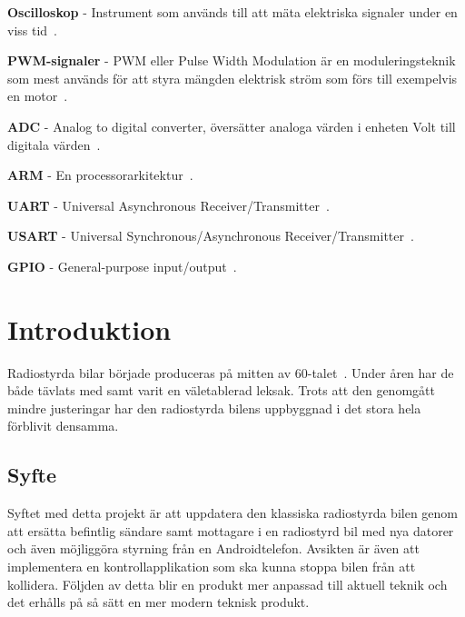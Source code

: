 \documentclass[a4paper]{article}
\begin{document}
\vspace{5mm} \noindent
{\bf Oscilloskop} - Instrument som används till att mäta elektriska signaler under en viss tid~\cite{oscilloscope}.


\vspace{5mm} \noindent
{\bf PWM-signaler} - PWM eller Pulse Width Modulation är en moduleringsteknik som mest används för att styra mängden elektrisk ström som förs till exempelvis en motor~\cite{PWM}.



\vspace{5mm} \noindent
{\bf ADC} - Analog to digital converter, översätter analoga värden i enheten Volt till digitala värden~\cite{ADC}.

\vspace{5mm} \noindent
{\bf ARM} - En processorarkitektur~\cite{chalmersARM}.

\vspace{5mm} \noindent
{\bf UART} - Universal Asynchronous Receiver/Transmitter~\cite{chalmersARM}.

\vspace{5mm} \noindent
{\bf USART} - Universal Synchronous/Asynchronous Receiver/Transmitter~\cite{chalmersARM}.

\vspace{5mm} \noindent
{\bf GPIO} - General-purpose input/output~\cite{chalmersARM}.



\newpage
\section{Introduktion}

Radiostyrda bilar började produceras på mitten av 60-talet~\cite{RCHistory}. Under åren har de både tävlats med samt varit en väletablerad leksak. Trots att den genomgått mindre justeringar har den radiostyrda bilens uppbyggnad i det stora hela förblivit densamma.

\subsection{Syfte}

Syftet med detta projekt är att uppdatera den klassiska radiostyrda bilen genom att ersätta befintlig sändare samt mottagare i en radiostyrd bil med nya datorer och även möjliggöra styrning från en Androidtelefon. Avsikten är även att implementera en kontrollapplikation som ska kunna stoppa bilen från att kollidera. Följden av detta blir en produkt mer anpassad till aktuell teknik och det erhålls på så sätt en mer modern teknisk produkt.
\end{document}
